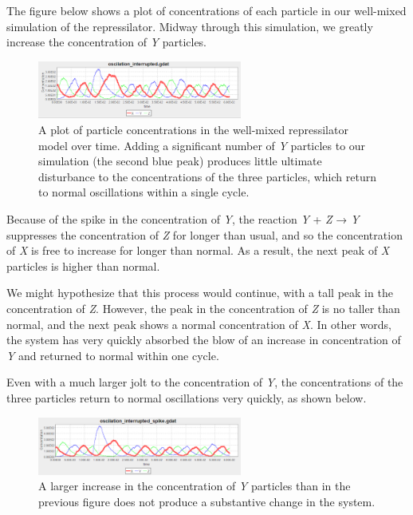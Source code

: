 The figure below shows a plot of concentrations of each particle in our well-mixed simulation of the repressilator.  Midway through this simulation, we greatly increase the concentration of \textit{Y} particles.

\begin{figure}[h]
\centering
\mySfFamily
\includegraphics[width = 0.6\textwidth]{../assets/images/600px/nf_sim_interrupted_chart.png}
\caption{A plot of particle concentrations in the well-mixed repressilator model over time. Adding a significant number of \textit{Y} particles to our simulation (the second blue peak) produces little ultimate disturbance to the concentrations of the three particles, which return to normal oscillations within a single cycle.}
\label{fig:nf_sim_interrupted_chart}
\end{figure}

Because of the spike in the concentration of \textit{Y}, the reaction \textit{Y} + \textit{Z} → \textit{Y} suppresses the concentration of \textit{Z} for longer than usual, and so the concentration of \textit{X} is free to increase for longer than normal. As a result, the next peak of \textit{X} particles is higher than normal.

We might hypothesize that this process would continue, with a tall peak in the concentration of \textit{Z}. However, the peak in the concentration of \textit{Z} is no taller than normal, and the next peak shows a normal concentration of \textit{X}. In other words, the system has very quickly absorbed the blow of an increase in concentration of \textit{Y} and returned to normal within one cycle.

Even with a much larger jolt to the concentration of \textit{Y}, the concentrations of the three particles return to normal oscillations very quickly, as shown below.

\begin{figure}[h]
\centering
\mySfFamily
\includegraphics[width = 0.6\textwidth]{../assets/images/600px/nf_sim_interrupted_chart_spike.png}
\caption{A larger increase in the concentration of \textit{Y} particles than in the previous figure does not produce a substantive change in the system.}
\label{fig:nf_sim_interrupted_chart_spike}
\end{figure}

